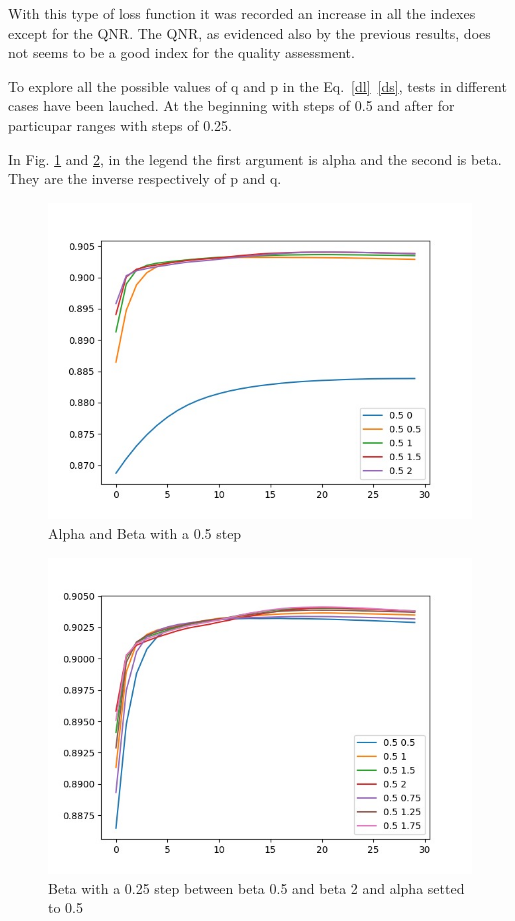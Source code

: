 \documentclass[12pt]{report}
\begin{document}
With this type of loss function it was recorded an increase in all the indexes except for the QNR.
The QNR, as evidenced also by the previous results, does not seems to be a good index for the quality assessment.

To explore all the possible values of q and p in the Eq.~\ref{dl}~\ref{ds}, 
tests in different cases have been lauched. At the beginning with steps of 0.5 and after for particupar ranges with steps of 0.25.

In Fig. \ref{fig:alpha_beta1} and \ref{fig:alpha_beta3}, in the legend the first argument is alpha and the second is beta.
They are the inverse respectively of p and q. 

\begin{figure}[t]
    \centering
    \includegraphics[scale=.5]{alpha_beta1.jpeg}
    \caption{Alpha and Beta with a 0.5 step}
    \label{fig:alpha_beta1}
\end{figure}


\begin{figure}
    \centering
    \includegraphics[scale=.5]{alpha_beta3.jpeg}
    \caption{Beta with a 0.25 step between beta 0.5 and beta 2 and alpha setted to 0.5}
    \label{fig:alpha_beta3}
\end{figure}
\end{document}
